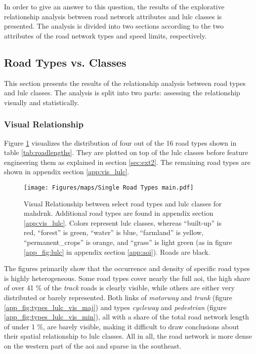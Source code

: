 In order to give an answer to this question, the results of the explorative relationship analysis between road network attributes and \gls{lulc} classes is presented. The analysis is divided into two sections according to the two attributes of the road network types and speed limits, respectively.

\subsection{Road Types vs.  Classes}

This section presents the results of the relationship analysis between road types and \gls{lulc} classes. The analysis is split into two parts: assessing the relationship visually and statistically.

\subsubsection*{Visual Relationship}
\label{subsec:vis}

Figure \ref{fig:types_lulc_vis} visualizes the distribution of four out of the 16 road types shown in table \ref{tab:roadlengths}. They are plotted on top of the \gls{lulc} classes before feature engineering them as explained in section \ref{sec:ext2}. The remaining road types are shown in appendix section \ref{app:vis_lulc}.

\begin{figure}[!htb]
    \centering
    \texttt{[image: Figures/maps/Single Road Types main.pdf]}
    \caption[Visual Relationship between Select Road Types and  Classes]{Visual Relationship between select road types and \gls{lulc} classes for \gls{mahdrnk}. Additional road types are found in appendix section \ref{app:vis_lulc}. Colors represent \gls{lulc} classes, whereas \enquote{built-up} is red, \enquote{forest} is green, \enquote{water} is blue, \enquote{farmland} is yellow, \enquote{permanent\_crops} is orange, and \enquote{grass} is light green (as in figure \ref{app_fig:lulc} in appendix section \ref{app:aoi}). Roads are black.}
    \label{fig:types_lulc_vis}
\end{figure}

The figures primarily show that the occurrence and density of specific road types is highly heterogeneous. Some road types cover nearly the full \gls{aoi}, the high share of over 41 \% of the \emph{track} roads is clearly visible, while others are either very distributed or barely represented. Both links of \emph{motorway} and \emph{trunk} (figure \ref{app_fig:types_lulc_vis_maj}) and types \emph{cycleway} and \emph{pedestrian} (figure \ref{app_fig:types_lulc_vis_min}), all with a share of the total road network length of under 1 \%, are barely visible, making it difficult to draw conclusions about their spatial relationship to \gls{lulc} classes. All in all, the road network is more dense on the western part of the \gls{aoi} and sparse in the southeast.

